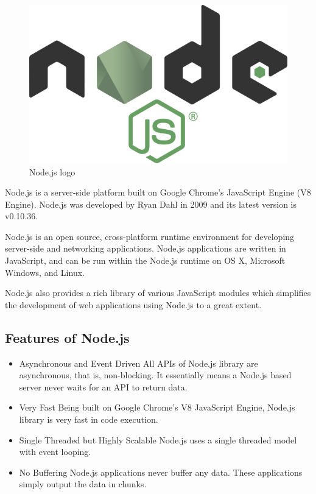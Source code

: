 \begin{figure}[h]
\centering \includegraphics[scale=0.13]{images/Node.png}
\caption{Node.js logo}
\end{figure}
\noindent Node.js is a server-side platform built on Google Chrome's JavaScript Engine (V8 Engine). Node.js was developed by Ryan Dahl in 2009 and its latest version is v0.10.36.

Node.js is an open source, cross-platform runtime environment for developing server-side and networking applications. Node.js applications are written in JavaScript, and can be run within the Node.js runtime on OS X, Microsoft Windows, and Linux.

Node.js also provides a rich library of various JavaScript modules which simplifies the development of web applications using Node.js to a great extent.

\subsection{Features of Node.js}
\begin{itemize}
\item Asynchronous and Event Driven \− All APIs of Node.js library are asynchronous, that is, non-blocking. It essentially means a Node.js based server never waits for an API to return data.
\item Very Fast \− Being built on Google Chrome's V8 JavaScript Engine, Node.js library is very fast in code execution.
\item Single Threaded but Highly Scalable \− Node.js uses a single threaded model with event looping.
\item No Buffering \− Node.js applications never buffer any data. These applications simply output the data in chunks.
\end{itemize}
